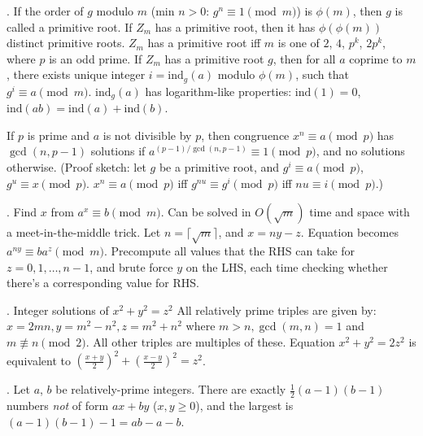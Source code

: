 
.  If the order of $g$ modulo $m$ (min $n>0$:
$g^n \equiv 1 \pmod{m}$) is $\phi(m)$, then $g$ is called a primitive root.
If $Z_m$ has a primitive root, then it has $\phi(\phi(m))$ distinct primitive
roots. $Z_m$ has a primitive root iff $m$ is one of $2$, $4$,
$p^k$, $2p^k$, where $p$ is an odd prime.
If $Z_m$ has a primitive root $g$, then for all $a$ coprime to $m$,
there exists unique integer $i=\text{ind}_g(a)$ modulo $\phi(m)$,
such that $g^i \equiv a \pmod{m}$.
$\text{ind}_g(a)$ has logarithm-like properties:
$\text{ind}(1) = 0$, $\text{ind}(ab) = \text{ind}(a) + \text{ind}(b)$.

If $p$ is prime and $a$ is not divisible by $p$, then congruence
$x^n \equiv a \pmod{p}$ has $\gcd(n, p-1)$ solutions if
$a^{(p-1)/\gcd(n,p-1)} \equiv 1 \pmod{p}$, and no solutions otherwise.
(Proof sketch: let $g$ be a primitive root, and
$g^i \equiv a \pmod{p}$, $g^u \equiv x \pmod{p}$.
$x^n \equiv a \pmod{p}$ iff $g^{nu} \equiv g^i \pmod{p}$ iff $nu \equiv i \pmod{p}$.)

.  Find $x$ from $a^x \equiv b \pmod{m}$.
Can be solved in $O(\sqrt{m})$ time and space with a meet-in-the-middle trick.
Let $n = \lceil \sqrt{m} \rceil$, and $x = ny - z$.
Equation becomes $a^{ny} \equiv b a^z \pmod{m}$.  Precompute all values that
the RHS can take for $z = 0, 1, \dots, n-1$, and brute force $y$ on the LHS,
each time checking whether there's a corresponding value for RHS.

.  Integer solutions of $x^2 + y^2 = z^2$
All relatively prime triples are given by:
$x=2mn, y=m^2-n^2, z=m^2+n^2$ where $m>n, \gcd(m,n)=1$ and $m \not\equiv n \pmod{2}$.
All other triples are multiples of these.
Equation $x^2 + y^2 = 2z^2$ is equivalent to $(\frac{x+y}{2})^2 + (\frac{x-y}{2})^2 = z^2$.

.  Let $a$, $b$ be relatively-prime integers.
There are exactly $\frac{1}{2}(a-1)(b-1)$ numbers \emph{not} of form $ax+by$ ($x,y \ge 0$),
and the largest is $(a-1)(b-1)-1 = ab - a - b$.

